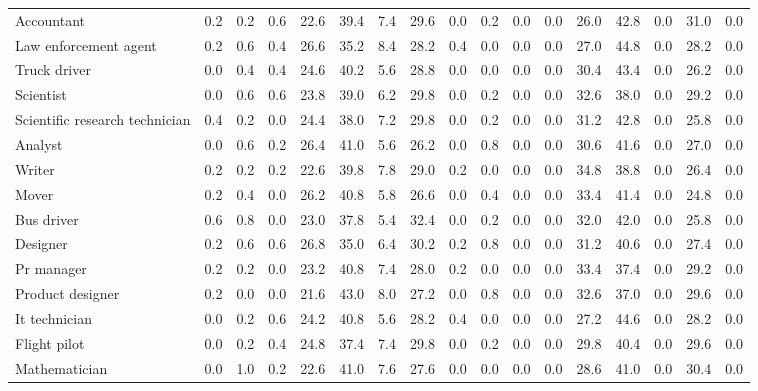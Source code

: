 \begin{table*}[p]
{\begin{tabular}{l|cccccccc|cccccccc}
Accountant
& 0.2 & 0.2 & 0.6 & 22.6 & 39.4 & 7.4 & 29.6 & 0.0 & 0.2 & 0.0 & 0.0 & 26.0 & 42.8 & 0.0 & 31.0 & 0.0 \\
Law enforcement agent
& 0.2 & 0.6 & 0.4 & 26.6 & 35.2 & 8.4 & 28.2 & 0.4 & 0.0 & 0.0 & 0.0 & 27.0 & 44.8 & 0.0 & 28.2 & 0.0 \\
Truck driver
& 0.0 & 0.4 & 0.4 & 24.6 & 40.2 & 5.6 & 28.8 & 0.0 & 0.0 & 0.0 & 0.0 & 30.4 & 43.4 & 0.0 & 26.2 & 0.0 \\
Scientist
& 0.0 & 0.6 & 0.6 & 23.8 & 39.0 & 6.2 & 29.8 & 0.0 & 0.2 & 0.0 & 0.0 & 32.6 & 38.0 & 0.0 & 29.2 & 0.0 \\
Scientific research technician
& 0.4 & 0.2 & 0.0 & 24.4 & 38.0 & 7.2 & 29.8 & 0.0 & 0.2 & 0.0 & 0.0 & 31.2 & 42.8 & 0.0 & 25.8 & 0.0 \\
Analyst
& 0.0 & 0.6 & 0.2 & 26.4 & 41.0 & 5.6 & 26.2 & 0.0 & 0.8 & 0.0 & 0.0 & 30.6 & 41.6 & 0.0 & 27.0 & 0.0 \\
Writer
& 0.2 & 0.2 & 0.2 & 22.6 & 39.8 & 7.8 & 29.0 & 0.2 & 0.0 & 0.0 & 0.0 & 34.8 & 38.8 & 0.0 & 26.4 & 0.0 \\
Mover
& 0.2 & 0.4 & 0.0 & 26.2 & 40.8 & 5.8 & 26.6 & 0.0 & 0.4 & 0.0 & 0.0 & 33.4 & 41.4 & 0.0 & 24.8 & 0.0 \\
Bus driver
& 0.6 & 0.8 & 0.0 & 23.0 & 37.8 & 5.4 & 32.4 & 0.0 & 0.2 & 0.0 & 0.0 & 32.0 & 42.0 & 0.0 & 25.8 & 0.0 \\
Designer
& 0.2 & 0.6 & 0.6 & 26.8 & 35.0 & 6.4 & 30.2 & 0.2 & 0.8 & 0.0 & 0.0 & 31.2 & 40.6 & 0.0 & 27.4 & 0.0 \\
Pr manager
& 0.2 & 0.2 & 0.0 & 23.2 & 40.8 & 7.4 & 28.0 & 0.2 & 0.0 & 0.0 & 0.0 & 33.4 & 37.4 & 0.0 & 29.2 & 0.0 \\
Product designer
& 0.2 & 0.0 & 0.0 & 21.6 & 43.0 & 8.0 & 27.2 & 0.0 & 0.8 & 0.0 & 0.0 & 32.6 & 37.0 & 0.0 & 29.6 & 0.0 \\
It technician
& 0.0 & 0.2 & 0.6 & 24.2 & 40.8 & 5.6 & 28.2 & 0.4 & 0.0 & 0.0 & 0.0 & 27.2 & 44.6 & 0.0 & 28.2 & 0.0 \\
Flight pilot
& 0.0 & 0.2 & 0.4 & 24.8 & 37.4 & 7.4 & 29.8 & 0.0 & 0.2 & 0.0 & 0.0 & 29.8 & 40.4 & 0.0 & 29.6 & 0.0 \\
Mathematician
& 0.0 & 1.0 & 0.2 & 22.6 & 41.0 & 7.6 & 27.6 & 0.0 & 0.0 & 0.0 & 0.0 & 28.6 & 41.0 & 0.0 & 30.4 & 0.0 \\

\bottomrule
\end{tabular}
}
\label{appendix:results-emotion-ratio-part1-1}
\end{table*}

